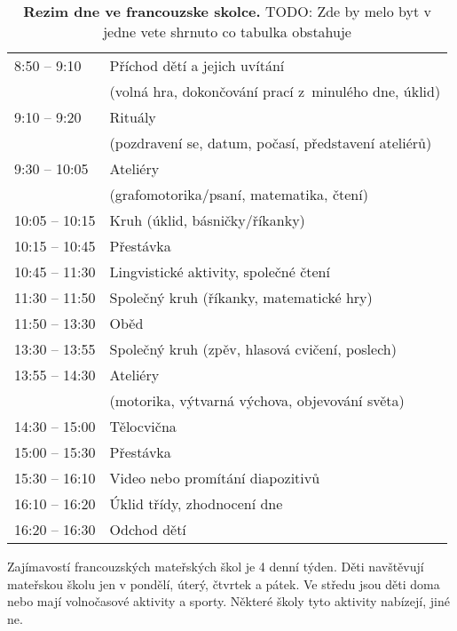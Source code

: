 	\begin{spacing}{1.0}
	\begin{table}
		\center
		\begin{tabular}{|l l|}
			\hline
			\rowcolor{grey!0}
			8:50 – 9:10 		& Příchod dětí a jejich uvítání 						\\
								& (volná hra, dokončování prací z minulého dne, úklid) 	\\
			9:10 – 9:20			& Rituály 												\\
								& (pozdravení se, datum, počasí, představení ateliérů) 	\\
			9:30 – 10:05		& Ateliéry 												\\
								& (grafomotorika/psaní, matematika, čtení) 				\\
			10:05 – 10:15		& Kruh (úklid, básničky/říkanky) 						\\
			10:15 – 10:45		& Přestávka 											\\
			10:45 – 11:30		& Lingvistické aktivity, společné čtení 				\\
			11:30 – 11:50		& Společný kruh (říkanky, matematické hry) 				\\
			11:50 – 13:30		& Oběd 													\\
			13:30 – 13:55		& Společný kruh (zpěv, hlasová cvičení, poslech) 		\\
			13:55 – 14:30		& Ateliéry 												\\
								&(motorika, výtvarná výchova, objevování světa) 		\\
			14:30 – 15:00		& Tělocvična 											\\
			15:00 – 15:30		& Přestávka 											\\
			15:30 – 16:10		& Video nebo promítání diapozitivů 						\\
			16:10 – 16:20		& Úklid třídy, zhodnocení dne 							\\
			16:20 – 16:30		& Odchod dětí 											\\
			\hline
		\end{tabular}
		\caption{ \textbf{Rezim dne ve francouzske skolce.}
			TODO: Zde by melo byt v jedne vete shrnuto co tabulka obstahuje
		}
		\label{tab:rezimDneFR}
	\end{table}
	\end{spacing}

			Zajímavostí francouzských mateřských škol je 4 denní týden. Děti navštěvují mateřskou školu jen v pondělí, úterý, čtvrtek a pátek. Ve středu jsou děti doma nebo mají volnočasové aktivity a sporty. Některé školy tyto aktivity nabízejí, jiné ne. 

